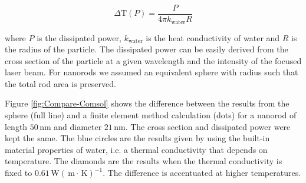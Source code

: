 \documentclass[journal=nalefd,manuscript=letter]{achemso}
\newcommand{\K}{\ensuremath{\,\textrm{K}}}
\newcommand{\nm}{\ensuremath{\,\textrm{nm}}}
\newcommand{\m}{\ensuremath{\,\textrm{m}}}
\newcommand{\W}{\ensuremath{\,\textrm{W}}}
\begin{document}
\begin{equation}
	\Delta \textrm{T}(P) = \frac{P}{4\pi k_{\textrm{water}} R}
\end{equation}

\noindent where $P$ is the dissipated power, $k_{\textrm{water}}$ is the heat
conductivity of water and $R$ is the radius of the particle.\cite{Baffou2013} 
The dissipated power can be
easily derived from the cross section of the particle at a given wavelength and
the intensity of the focused laser beam. For nanorods we assumed an
equivalent sphere with radius such that the total rod area is preserved.

Figure \ref{fig:Compare-Comsol} shows the difference between the results from
the sphere (full line) and a finite element method calculation
(dots) for a nanorod of length $50\nm$ and diameter $21\nm$. The cross section
and dissipated power were kept the same. The blue circles are the results given
by using the built-in material properties of water, i.e. a thermal conductivity
that depends on temperature. The diamonds are the results when the thermal
conductivity is fixed to $0.61 \W(\m\cdot\K)^{-1}$. The difference is
accentuated at higher temperatures.


 
\end{document}
